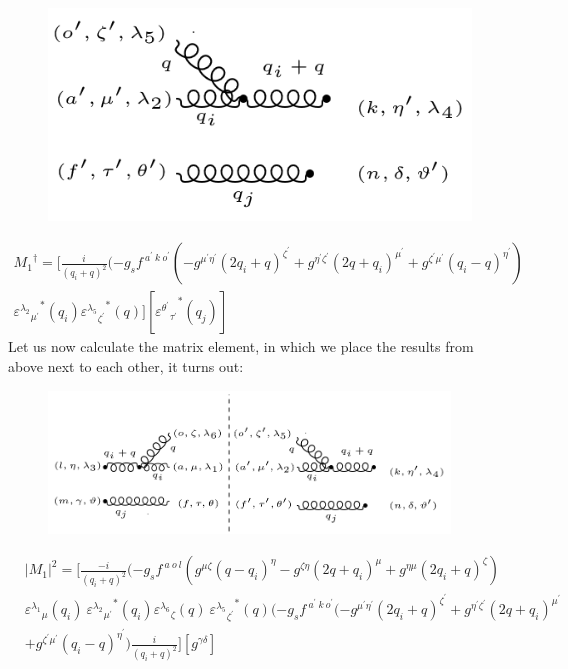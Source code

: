 \begin{figure}[ht!]
\centering
\includegraphics[scale=0.7]{images/GG/M1Daggergg.png}
\end{figure}
\begin{equation}
\begin{split}
{M_1}^{\dagger}=[\frac{i}{(q_i +q)^2}(-g_s f^{\:a^{\prime}\:k\: o^{\prime}}(-g^{{{\mu}^{\prime}}{{\eta}^{\prime}}}(2q_i+q)^{{\zeta}^{\prime}}+g^{{{\eta}^{\prime}}{{\zeta}^{\prime}}}(2q +q_i)^{{\mu}^{\prime}}+g^{{{\zeta}^{\prime}}{{\mu}^{\prime}}}(q_i-q)^{{\eta}^{\prime}})\\
{{\varepsilon^{\lambda_2}}_{{\mu}^{\prime}}}^* (q_i) {{\varepsilon^{\lambda_5}}_{{\zeta}^{\prime}}}^* (q)][{{\varepsilon^{{\theta}^{\prime}}}_{{\tau}^{\prime}}}^* (q_j)]
\end{split}
\end{equation}
\pagebreak
Let us now calculate the matrix element, in which we place the results from above next to each other, it turns out:
\begin{figure}[h!]
\centering
\includegraphics[width=0.95\textwidth]{images/GG/M1Squer.png}
\end{figure}
\begin{equation}
\begin{split}
&|M_1|^2=[\frac{-i}{(q_i +q)^2}(-g_s f^{\:a\:o\:l}(g^{{\mu}{\zeta}}(q-q_i)^{\eta}-g^{{\zeta}{\eta}}(2q +q_i)^{\mu}+g^{{\eta}{\mu}}(2q_i +q)^{\zeta})\\
&{\varepsilon^{\lambda_1}}_{\mu} (q_i)\:{{\varepsilon^{\lambda_2}}_{{\mu}^{\prime}}}^* (q_i) {\varepsilon^{\lambda_6}}_{\zeta} (q)\:{{\varepsilon^{\lambda_5}}_{{\zeta}^{\prime}}}^* (q)
(-g_s f^{\:a^{\prime}\:k\:o^{\prime}}(-g^{{{\mu}^{\prime}}{{\eta}^{\prime}}}(2q_i+q)^{{\zeta}^{\prime}}+g^{{{\eta}^{\prime}}{{\zeta}^{\prime}}}(2q +q_i)^{{\mu}^{\prime}}\\
&+g^{{{\zeta}^{\prime}}{{\mu}^{\prime}}}(q_i-q)^{{\eta}^{\prime}})\frac{i}{(q_i +q)^2}][g^{{\gamma}{\delta}}]
\end{split}
\end{equation}

